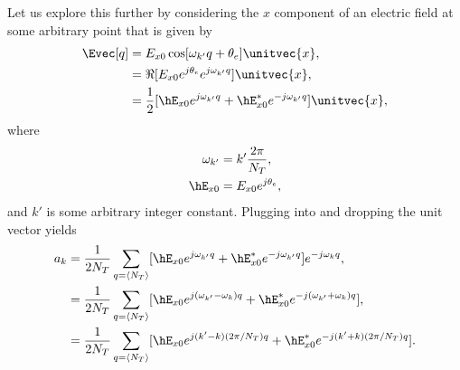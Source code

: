 Let us explore this further by considering the $x$ component of an
electric field at some arbitrary point that is given by
\begin{align}
  \Evec[q] &= E_{x0} \cos[\omega_{k'} q + \theta_e] \unitvec{x}, \nonumber \\
     &= \Re[E_{x0} e^{j\theta_e} e^{j\omega_{k'} q}] \unitvec{x}, \nonumber \\
     &= \frac{1}{2}[\hE_{x0} e^{j\omega_{k'} q} +
                    \hE_{x0}^* e^{-j\omega_{k'} q}] \unitvec{x},
   \label{eq:eForDft}
\end{align}
where 
\begin{align}
  \omega_{k'}  &= k' \frac{2\pi}{N_T}, \\
  \hE_{x0} &= E_{x0} e^{j\theta_e},
\end{align}
and $k'$ is some arbitrary integer constant.  Plugging
 into  and dropping the unit vector
yields
\begin{align}
  a_k &= \frac{1}{2N_T}
     \sum_{q=\langle N_T\rangle} 
     [\hE_{x0} e^{j\omega_{k'} q} + \hE_{x0}^* e^{-j\omega_{k'} q}]
     e^{-j\omega_k q}, \nonumber \\
  &=
    \frac{1}{2N_T}
     \sum_{q=\langle N_T\rangle} 
     [\hE_{x0} e^{j(\omega_{k'}-\omega_{k}) q} 
     + \hE_{x0}^* e^{-j(\omega_{k'} + \omega_{k}) q}], \nonumber \\
  &=
    \frac{1}{2N_T}
     \sum_{q=\langle N_T\rangle} 
     [\hE_{x0} e^{j(k' - k)(2\pi/N_T) q} 
       + \hE_{x0}^* e^{-j(k' + k)(2\pi/N_T) q}].
   \label{eq:akForSingleFreq}
\end{align}

